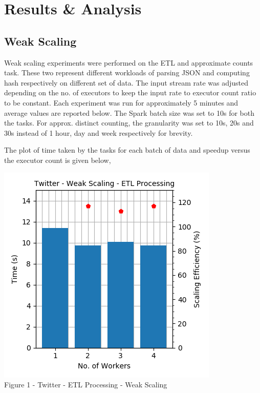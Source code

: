 \documentclass[11pt,a4paper,oneside]{article}
\begin{document}
    \section{Results \& Analysis}
    
    \subsection{Weak Scaling}
    
    Weak scaling experiments were performed on the ETL and approximate counts task. These two represent different workloads of parsing JSON and computing hash respectively on different set of data. The input stream rate was adjusted depending on the no. of executors to keep the input rate to executor count ratio to be constant. Each experiment was run for approximately 5 minutes and average values are reported below. The Spark batch size was set to 10s for both the tasks. For approx. distinct counting, the granularity was set to 10s, 20s and 30s instead of 1 hour, day and week respectively for brevity.
        
    The plot of time taken by the tasks for each batch of data and speedup versus the executor count is given below,    
    
    \begin{center}
    	\includegraphics[scale=0.5]{1.png} \\	
    	Figure 1 - Twitter - ETL Processing - Weak Scaling	
    \end{center}
\end{document}
